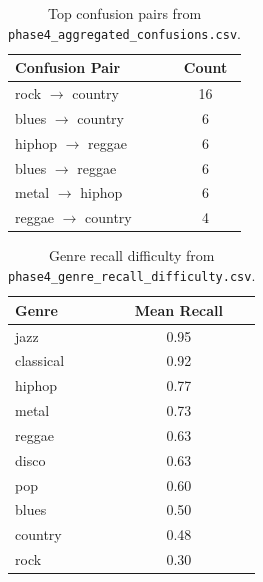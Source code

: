 \begin{table}[t]
	\centering
	\caption{Top confusion pairs from \texttt{phase4\_aggregated\_confusions.csv}.}
	\label{tab:phase4-top-confusions}
	\scriptsize
	\setlength{\tabcolsep}{3pt}
	\begin{tabular}{@{}lc@{}}
		\toprule
		Confusion Pair & Count \\
		\midrule
		rock $\rightarrow$ country & 16 \\
		blues $\rightarrow$ country & 6 \\
		hiphop $\rightarrow$ reggae & 6 \\
		blues $\rightarrow$ reggae & 6 \\
		metal $\rightarrow$ hiphop & 6 \\
		reggae $\rightarrow$ country & 4 \\
		\bottomrule
	\end{tabular}
\end{table}

\begin{table}[t]
	\centering
	\caption{Genre recall difficulty from \texttt{phase4\_genre\_recall\_difficulty.csv}.}
	\label{tab:phase4-genre-recall}
	\scriptsize
	\setlength{\tabcolsep}{3pt}
	\begin{tabular}{@{}lc@{}}
		\toprule
		Genre & Mean Recall \\
		\midrule
		jazz & 0.95 \\
		classical & 0.92 \\
		hiphop & 0.77 \\
		metal & 0.73 \\
		reggae & 0.63 \\
		disco & 0.63 \\
		pop & 0.60 \\
		blues & 0.50 \\
		country & 0.48 \\
		rock & 0.30 \\
		\bottomrule
	\end{tabular}
\end{table}